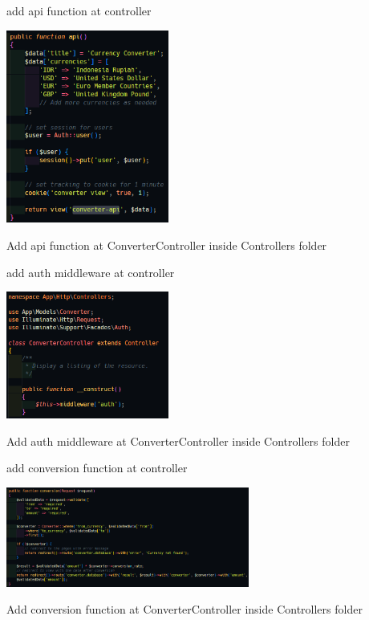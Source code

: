 \documentclass[aspectratio=169, table]{beamer}
\begin{document}
\begin{frame}{add api function at controller}
    \vskip1cm
    \begin{center}
        \includegraphics[width=0.4\textwidth]{classFiles/pertemuan-13-converter-controller-part-1.png}
       
        
        Add api function at ConverterController inside Controllers folder
    \end{center}
    \vfill %
\end{frame}

\begin{frame}{add auth middleware at controller}
    \vskip1cm
    \begin{center}
        \includegraphics[width=0.4\textwidth]{classFiles/pertemuan-13-converter-controller-part-2.png}
       
        
        Add auth middleware at ConverterController inside Controllers folder
    \end{center}
    \vfill %
\end{frame}

\begin{frame}{add conversion function at controller}
    \vskip1cm
    \begin{center}
        \includegraphics[width=0.6\textwidth]{classFiles/pertemuan-13-converter-controller-part-3.png}
       
        
        Add conversion function at ConverterController inside Controllers folder
    \end{center}
    \vfill %
\end{frame}
\end{document}
